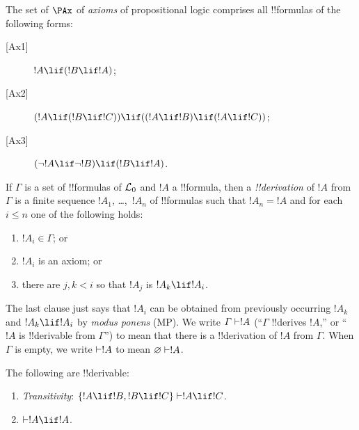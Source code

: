\documentclass[../../include/open-logic-section]{subfiles}
\begin{document}


\begin{defn}[Axioms]
The set of $\PAx$ of \emph{axioms} of propositional logic comprises
all !!{formula}s of the following forms:
\begin{description}
\item[{[Ax1]}] $!A \lif (!B \lif !A)$;
\item[{[Ax2]}] $(!A \lif (!B \lif !C)) \lif
    ((!A \lif !B) \lif (!A \lif !C))$;
\item[{[Ax3]}] $(\lnot !A \lif \lnot !B) \lif (!B
    \lif !A)$.
\end{description}
\end{defn}

\begin{defn}[!!^{derivability}]
If $\Gamma$ is a set of !!{formula}s of $\mathcal L_0$ and $!A$ a
!!{formula}, then a \emph{!!{derivation}} of $!A$ from $\Gamma$ is a
finite sequence $!A_1$, \dots,~$!A_n$ of !!{formula}s such that $!A_n =
!A$ and for each $i \le n$ one of the following holds:
\begin{enumerate}
\item $!A_i \in \Gamma$; or
\item $!A_i$ is an axiom; or
\item there are $j,k<i$ so that $!A_j$ is $!A_k \lif
  !A_i$.
\end{enumerate}
\end{defn}

\begin{explain}
The last clause just says that $!A_i$ can be obtained from
previously occurring $!A_k$ and $!A_k \lif !A_i$ by
\emph{modus ponens} (MP).  We write $\Gamma \Proves !A$
(``$\Gamma$ !!{derive}s $!A$,'' or ``$!A$ is !!{derivable} from
$\Gamma$'') to mean that there is a !!{derivation} of $!A$ from
$\Gamma$. When $\Gamma$ is empty, we write $\Proves !A$ to mean
$\varnothing \Proves !A$.
\end{explain}

\begin{prop}
The following are !!{derivable}:
\begin{enumerate}
\item {}
\emph{Transitivity}: $\{!A \lif !B, !B \lif !C\} \Proves
  !A \lif !C$.
\item {}
  $\Proves !A \lif !A$. 
\end{enumerate}
\end{prop}
\end{document}
